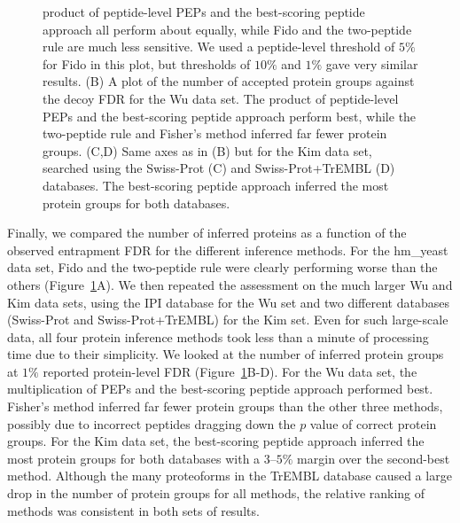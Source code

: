 \documentclass{article}
\begin{document}
\begin{figure}
{product of peptide-level PEPs and the best-scoring peptide approach 
all perform about equally, while Fido and the two-peptide rule are 
much less sensitive. We used a peptide-level threshold of $5\%$ 
for Fido in this plot, but thresholds of $10\%$ and $1\%$ gave very 
similar results. (B) A plot of the number of accepted protein groups 
against the decoy FDR for the Wu data set. The product of 
peptide-level PEPs and the best-scoring peptide approach perform best, 
while the two-peptide rule and Fisher's method inferred far fewer 
protein groups. (C,D) Same axes as in (B) but for the Kim data set, 
searched using the Swiss-Prot (C) and Swiss-Prot+TrEMBL (D) databases. 
The best-scoring peptide approach inferred the most protein groups 
for both databases.}
  \label{fig:power}
\end{figure}

Finally, we compared the number of inferred proteins as a function of 
the observed entrapment FDR for the different inference methods.  For 
the hm\_yeast data set, Fido and the two-peptide rule were clearly 
performing worse than the others (Figure~\ref{fig:power}A). We then 
repeated the assessment on the much larger Wu and Kim data sets, using 
the IPI database for the Wu set and two different databases 
(Swiss-Prot and Swiss-Prot+TrEMBL) for the Kim set. Even for such 
large-scale data, all four protein inference methods took less than a 
minute of processing time due to their simplicity. We looked at the
number of inferred protein groups at $1\%$ reported protein-level FDR
(Figure~\ref{fig:power}B-D). For the Wu data set, the multiplication
of PEPs and the best-scoring peptide approach performed best. Fisher's
method inferred far fewer protein groups than the other three methods,
possibly due to incorrect peptides dragging down the $p$ value of
correct protein groups. For the Kim data set, the best-scoring peptide
approach inferred the most protein groups for both databases with a
$3\mbox{--}5\%$ margin over the second-best method. Although the many
proteoforms in the TrEMBL database caused a large drop in the number
of protein groups for all methods, the relative ranking of methods was
consistent in both sets of results. 
\end{document}
